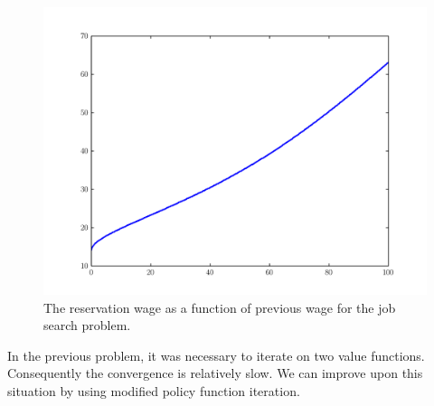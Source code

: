 \begin{figure}
\includegraphics[width=\textwidth]{reservation_wage.pdf}
\caption{The reservation wage as a function of previous wage for the job search problem.}
\label{fig:res_wage}
\end{figure}

In the previous problem, it was necessary to iterate on two value functions.  
Consequently the convergence is relatively slow.  
We can improve upon this situation by using modified policy function iteration.

